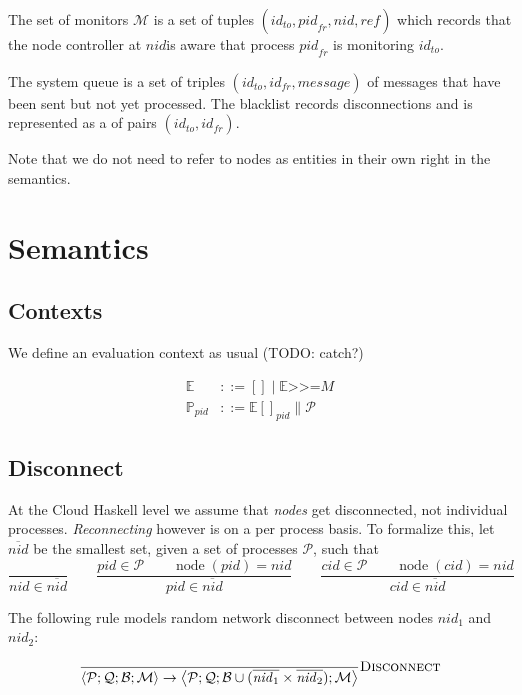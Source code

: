 \documentclass{article}
\newcommand{\sBind}[2]{{#1} \mathrel{\texttt{>}\!\!\texttt{>}\!\texttt{=}} {#2}}
\DeclareMathOperator{\sNodeOf}{node}
\newcommand{\sPar}{\mathrel{\parallel}}
\newcommand{\sNid}{\ensuremath{\mathit{nid}}}
\newcommand{\sPid}{\ensuremath{\mathit{pid}}}
\newcommand{\sCid}{\ensuremath{\mathit{cid}}}
\newcommand{\sId}{\ensuremath{\mathit{id}}}
\newcommand{\sRef}{\ensuremath{\mathit{ref}}}
\newcommand{\sSystem}[4]{\left\langle #1 ; #2 ; #3 ; #4 \right\rangle}
\newcommand{\sQueue}{\mathcal{Q}}
\newcommand{\sProcesses}{\mathcal{P}}
\newcommand{\sBlacklist}{\mathcal{B}}
\newcommand{\sMonitors}{\mathcal{M}}
\newcommand{\sCtxt}[1]{\mathbb{#1}}
\newcommand{\OR}{\mathrel{|}}
\begin{document}
The set of monitors $\sMonitors$ is a set of tuples 
  $(\sId_\mathit{to}, \sPid_\mathit{fr}, \sNid, \sRef)$ 
which records that the node controller at \sNid is aware that process
$\sPid_\mathit{fr}$ is monitoring $\sId_\mathit{to}$.

The system queue is a set of triples $(\sId_\mathit{to}, \sId_\mathit{fr},
\mathit{message})$ of messages that have been sent but not yet processed. The
blacklist records disconnections and is represented as a of pairs
$(\sId_\mathit{to}, \sId_\mathit{fr})$. 

Note that we do not need to refer to nodes as entities in their own right in
the semantics.

\section{Semantics}

\subsection{Contexts}

We define an evaluation context as usual (TODO: catch?)

\begin{align*}
\sCtxt{E} & ::= [] \OR \sBind{\sCtxt{E}}{M}  \\
\sCtxt{P}_\sPid  & ::= \sCtxt{E}[]_\sPid \sPar \sProcesses
\end{align*}

\subsection{Disconnect}

At the Cloud Haskell level we assume that \emph{nodes} get disconnected, not
individual processes. \emph{Reconnecting} however is on a per process basis. To
formalize this, let $\overline{\sNid}$ be the smallest set, given a set of
processes $\sProcesses$, such that
%
\begin{equation*}
\frac{
}{
\sNid \in \overline{\sNid}
} 
%
\qquad
%
\frac{
\sPid \in \sProcesses \qquad
\sNodeOf(\sPid) = \sNid
}{
\sPid \in \overline{\sNid}
}
%
\qquad
%
\frac{
\sCid \in \sProcesses \qquad
\sNodeOf(\sCid) = \sNid
}{
\sCid \in \overline{\sNid}
}
\end{equation*}

The following rule models random network disconnect between nodes $\sNid_1$ and
$\sNid_2$:

\begin{equation*}
\frac{
}{
  \sSystem{\sProcesses}{\sQueue}{\sBlacklist}{\sMonitors}
\rightarrow
  \sSystem{\sProcesses}{\sQueue}{\sBlacklist \cup (\overline{\sNid_1} \times \overline{\sNid_2})}{\sMonitors}
} \textsc{Disconnect}
\end{equation*}
\end{document}

